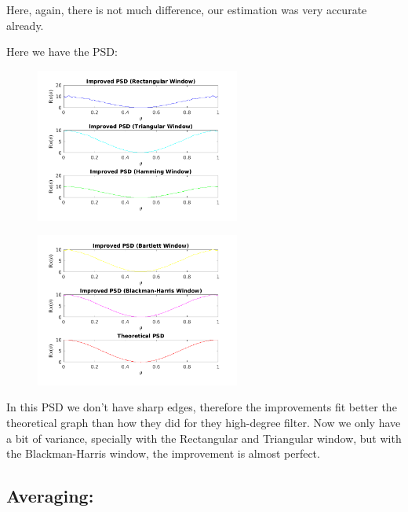 \documentclass[a4paper,11pt]{article}
\begin{document}
Here, again, there is not much difference, our estimation was very accurate
already.

\newpage

Here we have the PSD:

\begin{figure}[!hp]
    \begin{center}
      \includegraphics[width=0.6\textwidth]{images/study2/psd_ld_window1.png}
    \end{center}
\end{figure}

\begin{figure}[!hp]
    \begin{center}
      \includegraphics[width=0.6\textwidth]{images/study2/psd_ld_window2.png}
    \end{center}
\end{figure}

In this PSD we don't have sharp edges, therefore the improvements fit better
the theoretical graph than how they did for they high-degree filter. Now we
only have a bit of variance, specially with the Rectangular and Triangular
window, but with the Blackman-Harris window, the improvement is almost perfect.

\newpage

\subsection{Averaging:}
\end{document}
